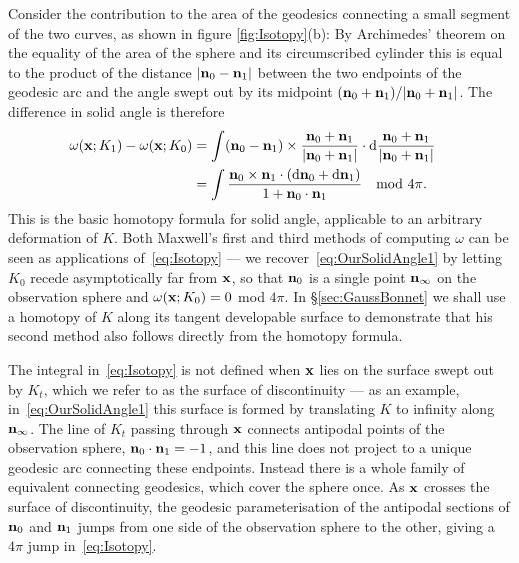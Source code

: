     Consider the contribution to the area of the geodesics connecting a small segment of the two curves, as shown in figure \ref{fig:Isotopy}(b): By Archimedes' theorem on the equality of the area of the sphere and its circumscribed cylinder this is equal to the product of the distance $|{\bf n}_0-{\bf n}_1|$ between the two endpoints of the geodesic arc and the angle swept out by its midpoint $({\bf n}_0+{\bf n}_1)/|{\bf n}_0+{\bf n}_1|$. The difference in solid angle is therefore 
    \begin{align}
        \omega({\bf x}; K_1) - \omega({\bf x}; K_0)
        &=
        \int ({\bf n}_0 - {\bf n}_1) \times \frac{{\bf n}_0 + {\bf n}_1}{|{\bf n}_0 + {\bf n}_1|} \cdot \mathrm{d} \frac{{\bf n}_0 + {\bf n}_1}{|{\bf n}_0 + {\bf n}_1|} \quad  \nonumber \\ 
        &=
        \int \frac{{\bf n}_0 \times {\bf n}_1 \cdot ( \mathrm{d}{\bf n}_0 + \mathrm{d}{\bf n}_1 )}{1+{\bf n}_0 \cdot {\bf n}_1} \quad \textrm{mod } 4\pi.
        \label{eq:Isotopy}
    \end{align}
    This is the basic homotopy formula for solid angle, applicable to an arbitrary deformation of $K$. Both Maxwell's first and third methods of computing $\omega$ can be seen as applications of~\eqref{eq:Isotopy} --- we recover~\eqref{eq:OurSolidAngle1} by letting $K_0$ recede asymptotically far from $\bf x$, so that ${\bf n}_0$ is a single point ${\bf n}_{\infty}$ on the observation sphere and $\omega({\bf x}; K_0)=0$ mod $4\pi$. In \S\ref{sec:GaussBonnet} we shall use a homotopy of $K$ along its tangent developable surface to demonstrate that his second method also follows directly from the homotopy formula. 

    The integral in~\eqref{eq:Isotopy} is not defined when $\bf x$ lies on the surface swept out by $K_t$, which we refer to as the surface of discontinuity --- as an example, in~\eqref{eq:OurSolidAngle1} this surface is formed by translating $K$ to infinity along ${\bf n}_\infty$. The line of $K_t$ passing through $\bf x$ connects antipodal points of the observation sphere, ${\bf n}_0 \cdot {\bf n}_1= -1$, and this line does not project to a unique geodesic arc connecting these endpoints. Instead there is a whole family of equivalent connecting geodesics, which cover the sphere once. As $\bf x$ crosses the surface of discontinuity, the geodesic parameterisation of the antipodal sections of ${\bf n}_0$ and ${\bf n}_1$ jumps from one side of the observation sphere to the other, giving a $4 \pi$ jump in~\eqref{eq:Isotopy}.

